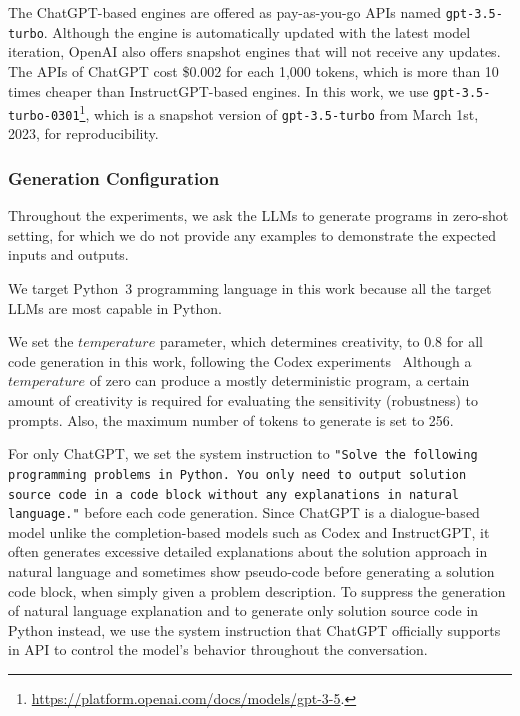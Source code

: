 \documentclass{article}
\begin{document}
The ChatGPT-based engines are offered as pay-as-you-go APIs named \texttt{gpt-3.5-turbo}.
Although the engine is automatically updated with the latest model iteration, OpenAI also offers snapshot engines that will not receive any updates.
The APIs of ChatGPT cost \$0.002 for each 1,000 tokens, which is more than 10 times cheaper than InstructGPT-based engines.
In this work, we use \texttt{gpt-3.5-turbo-0301}\footnote{\url{https://platform.openai.com/docs/models/gpt-3-5}.}, which is a snapshot version of \texttt{gpt-3.5-turbo} from March 1st, 2023, for reproducibility.





\subsubsection{Generation Configuration}
\label{sec:experiments:models:config}

Throughout the experiments, we ask the LLMs to generate programs in zero-shot setting, for which we do not provide any examples to demonstrate the expected inputs and outputs.

We target Python~3 programming language in this work because all the target LLMs are most capable in Python.

We set the $temperature$ parameter, which determines creativity, to 0.8 for all code generation in this work, following the Codex experiments~\citep{chen2021codex}
Although a $temperature$ of zero can produce a mostly deterministic program, a certain amount of creativity is required for evaluating the sensitivity (robustness) to prompts.
Also, the maximum number of tokens to generate is set to 256.

For only ChatGPT, we set the system instruction to \texttt{"Solve the following programming problems in Python. You only need to output solution source code in a code block without any explanations in natural language."} before each code generation.
Since ChatGPT is a dialogue-based model unlike the completion-based models such as Codex and InstructGPT, it often generates excessive detailed explanations about the solution approach in natural language and sometimes show pseudo-code before generating a solution code block, when simply given a problem description.
To suppress the generation of natural language explanation and to generate only solution source code in Python instead, we use the system instruction that ChatGPT officially supports in API to control the model's behavior throughout the conversation.
\end{document}

